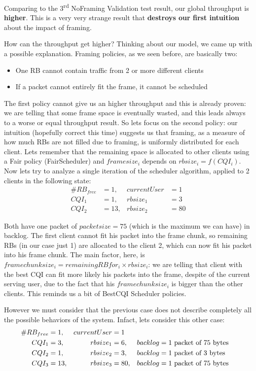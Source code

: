 Comparing to the 3\textsuperscript{rd} NoFraming Validation test result, our global throughput is \textbf{higher}. This is a very very strange result that \textbf{destroys our first intuition} about the impact of framing.

How can the throughput get higher? Thinking about our model, we came up with a possible explanation. Framing policies, as we seen before, are basically two:
\begin{itemize}
	\item One RB cannot contain traffic from 2 or more different clients
	\item If a packet cannot entirely fit the frame, it cannot be scheduled
\end{itemize}
The first policy cannot give us an higher throughput and this is already proven: we are telling that some frame space is eventually wasted, and this leads always to a worse or equal throughput result. So lets focus on the second policy: our intuition (hopefully correct this time) suggests us that framing, as a measure of how much RBs are not filled due to framing, is uniformly distributed for each client. Lets remember that the remaining space is allocated to other clients using a Fair policy (FairScheduler) and \(framesize_i\) depends on \(rbsize_i = f(CQI_i)\). Now lets try to analyze a single iteration of the scheduler algorithm, applied to 2 clients in the following state:
\begin{align}
 \#RB_{free} &= 1, &currentUser &= 1 \nonumber \\
 	   CQI_1 &= 1, &rbsize_1 &= 3 \nonumber \\
	   CQI_2 &= 13, &rbsize_2 &= 80 \nonumber
\end{align}

Both have one packet of \(packetsize=75\) (which is the maximum we can have) in backlog. The first client cannot fit his packet into the frame chunk, so remaining RBs (in our case just 1) are allocated to the client 2, which can now fit his packet into his frame chunk. The main factor, here, is \(framechunksize_i = remainingRBfor_i \times rbsize_i\): we are telling that client with the best CQI can fit more likely his packets into the frame, despite of the current serving user, due to the fact that his \(framechunksize_i\) is bigger than the other clients. This reminds us a bit of BestCQI Scheduler policies.

However we must consider that the previous case does not describe completely all the possible behaviors of the system. Infact, lets consider this other case:
\begin{align}
	\#RB_{free} &= 1, &currentUser &= 1 \nonumber \\ 
	CQI_1 &= 3, &rbsize_1 &= 6, & backlog &= \textnormal{1 packet of 75 bytes} \nonumber \\
	CQI_2 &= 1, &rbsize_2 &= 3, &backlog &= \textnormal{1 packet of 3 bytes} \nonumber \\
	CQI_3 &= 13, &rbsize_3 &= 80, &backlog &= \textnormal{1 packet of 75 bytes} \nonumber 
\end{align}

